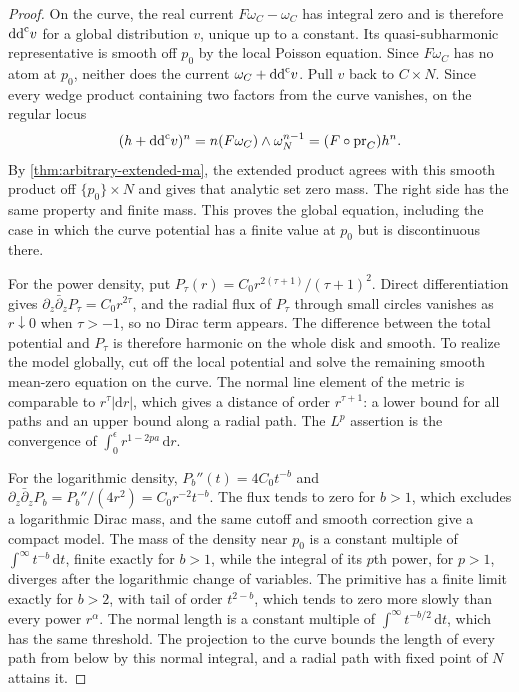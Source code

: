 \begin{proof}
On the curve, the real current $F\omega_C-\omega_C$ has integral zero and is therefore $\mathrm{dd}^{\mathrm{c}} v$ for a global distribution $v$, unique up to a constant. Its quasi-subharmonic representative is smooth off $p_0$ by the local Poisson equation. Since $F\omega_C$ has no atom at $p_0$, neither does the current $\omega_C+\mathrm{dd}^{\mathrm{c}} v$. Pull $v$ back to $C\times N$. Since every wedge product containing two factors from the curve vanishes, on the regular locus
\begin{equation}\label{eq:curve-product-equation}
 (h+\mathrm{dd}^{\mathrm{c}} v)^n=n(F\omega_C)\wedge\omega_N^{n-1}
 =(F\circ\operatorname{pr}_C)h^n.
\end{equation}
By \cref{thm:arbitrary-extended-ma}, the extended product agrees with this smooth product off $\{p_0\}\times N$ and gives that analytic set zero mass. The right side has the same property and finite mass. This proves the global equation, including the case in which the curve potential has a finite value at $p_0$ but is discontinuous there.

For the power density, put $P_\tau(r)=C_0r^{2(\tau+1)}/(\tau+1)^2$. Direct differentiation gives $\partial_z\bar\partial_zP_\tau=C_0r^{2\tau}$, and the radial flux of $P_\tau$ through small circles vanishes as $r\downarrow0$ when $\tau>-1$, so no Dirac term appears. The difference between the total potential and $P_\tau$ is therefore harmonic on the whole disk and smooth. To realize the model globally, cut off the local potential and solve the remaining smooth mean-zero equation on the curve. The normal line element of the metric is comparable to $r^\tau|\mathrm{d} r|$, which gives a distance of order $r^{\tau+1}$: a lower bound for all paths and an upper bound along a radial path. The $L^p$ assertion is the convergence of $\int_0^\epsilon r^{1-2pa}\,\mathrm{d} r$.

For the logarithmic density, $P_b''(t)=4C_0t^{-b}$ and $\partial_z\bar\partial_zP_b=P_b''/(4r^2)=C_0r^{-2}t^{-b}$. The flux tends to zero for $b>1$, which excludes a logarithmic Dirac mass, and the same cutoff and smooth correction give a compact model. The mass of the density near $p_0$ is a constant multiple of $\int^\infty t^{-b}\,\mathrm{d} t$, finite exactly for $b>1$, while the integral of its $p$th power, for $p>1$, diverges after the logarithmic change of variables. The primitive has a finite limit exactly for $b>2$, with tail of order $t^{2-b}$, which tends to zero more slowly than every power $r^\alpha$. The normal length is a constant multiple of $\int^\infty t^{-b/2}\,\mathrm{d} t$, which has the same threshold. The projection to the curve bounds the length of every path from below by this normal integral, and a radial path with fixed point of $N$ attains it.


\end{proof}
